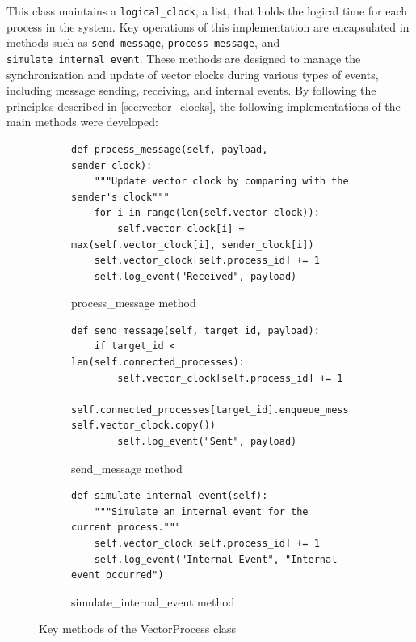 \documentclass{article}
\begin{document}
      
      This class maintains a \texttt{logical\_clock}, a list, that holds the logical time for each process in the system. Key operations of this implementation are encapsulated in methods such as \texttt{send\_message}, \texttt{process\_message}, and \texttt{simulate\_internal\_event}. These methods are designed to manage the synchronization and update of vector clocks during various types of events, including message sending, receiving, and internal events.
      By following the principles described in \ref*{sec:vector_clocks}, the following implementations of the main methods were developed:
      \begin{figure}[h!]
        \centering
        \begin{subfigure}{0.51\textwidth}
        \begin{verbatim}
def process_message(self, payload, sender_clock):
    """Update vector clock by comparing with the sender's clock"""
    for i in range(len(self.vector_clock)):
        self.vector_clock[i] = max(self.vector_clock[i], sender_clock[i])
    self.vector_clock[self.process_id] += 1
    self.log_event("Received", payload)
        \end{verbatim}
        \caption{process\_message method}
        \label{fig:process_message}
    \end{subfigure}
    \hfill
    \begin{subfigure}{0.51\textwidth}
        \begin{verbatim}
def send_message(self, target_id, payload):
    if target_id < len(self.connected_processes):
        self.vector_clock[self.process_id] += 1
        self.connected_processes[target_id].enqueue_message(payload, self.vector_clock.copy())
        self.log_event("Sent", payload)
        \end{verbatim}
        \caption{send\_message method}
        \label{fig:send_message}
    \end{subfigure}
    \par\bigskip %
    \begin{subfigure}{0.51\textwidth}
        \begin{verbatim}
def simulate_internal_event(self):
    """Simulate an internal event for the current process."""
    self.vector_clock[self.process_id] += 1
    self.log_event("Internal Event", "Internal event occurred")
        \end{verbatim}
        \caption{simulate\_internal\_event method}
        \label{fig:simulate_internal_event}
    \end{subfigure}
    \caption{Key methods of the VectorProcess class}
    \label{fig:vector_process_methods}
\end{figure}
\end{document}

